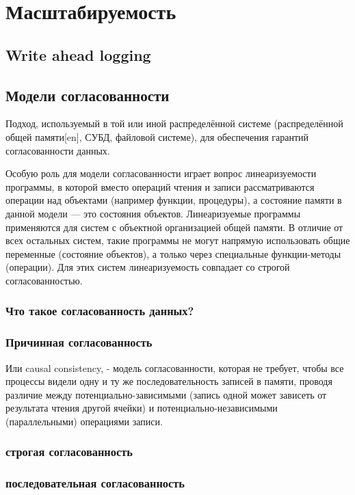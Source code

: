 \chapter{Масштабируемость}

\section{Write ahead logging}

\section{Модели согласованности}
Подход, используемый в той или иной распределённой системе (распределённой общей памяти[en], СУБД, файловой системе), для обеспечения гарантий согласованности данных. 

Особую роль для модели согласованности играет вопрос линеаризуемости программы, в которой вместо операций чтения и записи рассматриваются операции над объектами (например функции, процедуры), а состояние памяти в данной модели — это состояния объектов. Линеаризуемые программы применяются для систем с объектной организацией общей памяти. В отличие от всех остальных систем, такие программы не могут напрямую использовать общие переменные (состояние объектов), а только через специальные функции-методы (операции). Для этих систем линеаризуемость совпадает со строгой согласованностью. 

\subsection{Что такое согласованность данных?}

\subsection{Причинная согласованность}
Или causal consistency, - модель согласованности, которая не требует, чтобы все процессы видели одну и ту же последовательность записей в памяти, проводя различие между потенциально-зависимыми (запись одной может зависеть от результата чтения другой ячейки) и потенциально-независимыми (параллельными) операциями записи.

\subsection{строгая согласованность}
\subsection{последовательная согласованность}
